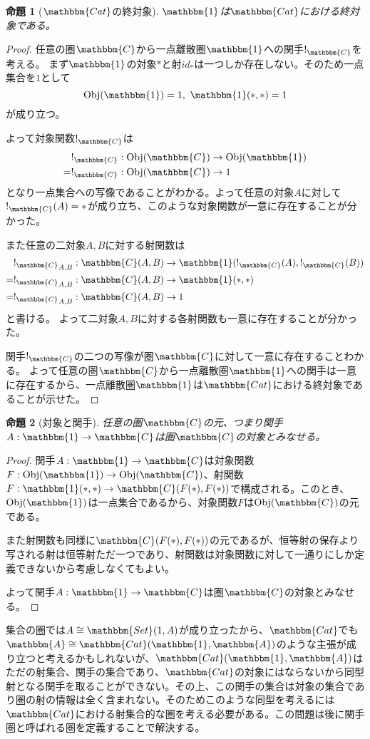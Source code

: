 \documentclass[uplatex,dvipdfmx]{jsarticle}
\newcommand{\cat}[1]{\mathbbm{#1}}
\newcommand{\arrow}{\rightarrow}
\newcommand{\functor}[3]{#1:\cat{#2}\arrow \cat{#3}}
\newcommand{\obj}[1]{\mathrm{Obj}(\cat{#1})}
\newcommand{\mor}[3]{#1:#2\arrow #3}
\newcommand{\arset}[3]{\cat{#1}(#2,#3)}
\newtheorem{proof}{証明}[section]
\newtheorem{prop}[proof]{命題}
\numberwithin{proof}{subsection}
\begin{document}
	\begin{prop}[$\cat{Cat}$の終対象]
		$\cat{1}$は$\cat{Cat}$における終対象である。
	\end{prop}
	\begin{proof}
		任意の圏$\cat{C}$から一点離散圏$\cat{1}$への関手$!_{\cat{C}}$を考える。
		まず$\cat{1}$の対象$*$と射$id_*$は一つしか存在しない。そのため一点集合を$1$として
		\[\obj{1}=1,\ \arset{1}{*}{*}=1\]が成り立つ。

		よって対象関数$!_{\cat{C}}$は
		\begin{align*}
			&\mor{!_{\cat{C}}}{\obj{C}}{\obj{1}}\\
			=&\mor{!_{\cat{C}}}{\obj{C}}{1}
		\end{align*}
		となり一点集合への写像であることがわかる。よって任意の対象$A$に対して$!_{\cat{C}}(A)=*$が成り立ち、このような対象関数が一意に存在することが分かった。

		また任意の二対象$A,B$に対する射関数は
		\begin{align*}
			&\mor{{!_{\cat{C}}}_{A,B}}{\arset{C}{A}{B}}{\arset{1}{!_{\cat{C}}(A)}{!_{\cat{C}}(B)}}\\
			=&\mor{{!_{\cat{C}}}_{A,B}}{\arset{C}{A}{B}}{\arset{1}{*}{*}}\\
			=&\mor{{!_{\cat{C}}}_{A,B}}{\arset{C}{A}{B}}{1}\\
		\end{align*}と書ける。
		よって二対象$A,B$に対する各射関数も一意に存在することが分かった。

		関手$!_{\cat{C}}$の二つの写像が圏$\cat{C}$に対して一意に存在することわかる。
		よって任意の圏$\cat{C}$から一点離散圏$\cat{1}$への関手は一意に存在するから、一点離散圏$\cat{1}$は$\cat{Cat}$における終対象であることが示せた。
	\end{proof}
	\begin{prop}[対象と関手]
		任意の圏$\cat{C}$の元、つまり関手$\functor{A}{1}{C}$は圏$\cat{C}$の対象とみなせる。
	\end{prop}
	\begin{proof}
		関手$\functor{A}{1}{C}$は対象関数$\mor{F}{\obj{1}}{\obj{C}}$、射関数$\mor{F}{\arset{1}{*}{*}}{\arset{C}{F(*)}{F(*)}}$で構成される。このとき、$\obj{1}$は一点集合であるから、対象関数$F$は$\obj{C}$の元である。

		また射関数も同様に$\arset{C}{F(*)}{F(*)}$の元であるが、恒等射の保存より写される射は恒等射ただ一つであり、射関数は対象関数に対して一通りにしか定義できないから考慮しなくてもよい。

		よって関手$\functor{A}{1}{C}$は圏$\cat{C}$の対象とみなせる。
	\end{proof}
  集合の圏では$A\cong\arset{Set}{1}{A}$が成り立ったから、$\cat{Cat}$でも$\cat{A}\cong\arset{Cat}{\cat{1}}{\cat{A}}$のような主張が成り立つと考えるかもしれないが、$\arset{Cat}{\cat{1}}{\cat{A}}$はただの射集合、関手の集合であり、$\cat{Cat}$の対象にはならないから同型射となる関手を取ることができない。その上、この関手の集合は対象の集合であり圏の射の情報は全く含まれない。そのためこのような同型を考えるには$\cat{Cat}$における射集合的な圏を考える必要がある。この問題は後に関手圏と呼ばれる圏を定義することで解決する。
\end{document}
